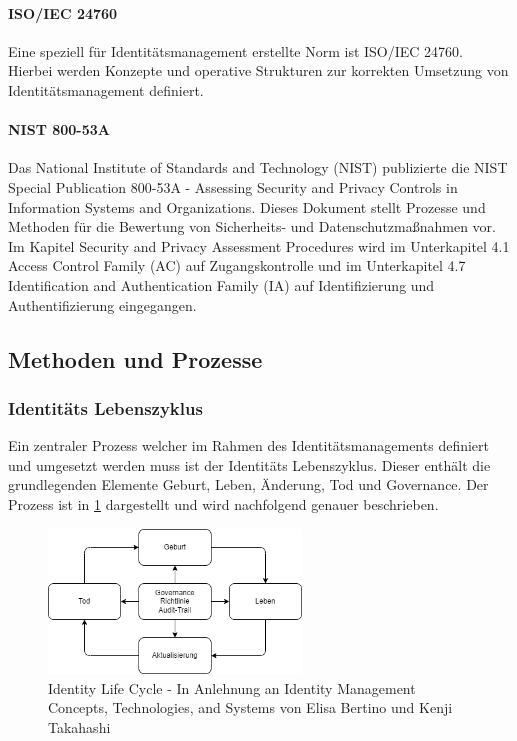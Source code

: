 \documentclass[12pt]{article}
\begin{document}
\paragraph{ISO/IEC 24760}
Eine speziell für Identitätsmanagement erstellte Norm ist ISO/IEC 24760. Hierbei werden Konzepte und operative Strukturen zur korrekten Umsetzung von Identitätsmanagement definiert.~\cite{isoiec24760}
\paragraph{NIST 800-53A}
Das National Institute of Standards and Technology (NIST) publizierte die \glqq{}NIST Special Publication 800-53A - Assessing Security and Privacy Controls in Information Systems and Organizations\grqq{}. Dieses Dokument stellt Prozesse und Methoden für die Bewertung von Sicherheits- und Datenschutzmaßnahmen vor. Im Kapitel \glqq{}Security and Privacy Assessment Procedures\grqq{} wird im Unterkapitel 4.1 \glqq{}Access Control Family (AC)\grqq{} auf Zugangskontrolle und im Unterkapitel 4.7 \glqq{}Identification and Authentication Family (IA)\grqq{} auf Identifizierung und Authentifizierung eingegangen.
\subsection{Methoden und Prozesse}
\subsubsection{Identitäts Lebenszyklus}
Ein zentraler Prozess welcher im Rahmen des Identitätsmanagements definiert und umgesetzt werden muss ist der Identitäts Lebenszyklus. Dieser enthält die grundlegenden Elemente Geburt, Leben, Änderung, Tod und Governance. Der Prozess ist in \cref{fig:idlc} dargestellt und wird nachfolgend genauer beschrieben.~\cite{bertino2010identity}
\begin{figure}[H]
  \centering
  \includegraphics[width=0.6\textwidth]{assets/idlc.png}
  \caption{Identity Life Cycle - In Anlehnung an Identity Management Concepts, Technologies, and Systems von Elisa Bertino und Kenji Takahashi}\label{fig:idlc}
\end{figure}
\end{document}
